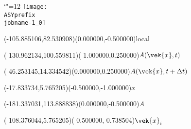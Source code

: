 \setlength{\unitlength}{1pt}%
\makeatletter%
\let\ASYencoding\f@encoding%
\let\ASYfamily\f@family%
\let\ASYseries\f@series%
\let\ASYshape\f@shape%
\makeatother%
{\catcode`"=12%
\texttt{[image: \\ASYprefix\\jobname-1\_0]}%
}%
%
%
\fontsize{8.000000}{9.600000}\selectfont%
\usefont{\ASYencoding}{\ASYfamily}{\ASYseries}{\ASYshape}%
\ASYalign(-105.885106,82.530908)(0.000000,-0.500000){local}%
%
%
\fontsize{8.000000}{9.600000}\selectfont%
\ASYalign(-130.962134,100.559811)(-1.000000,0.250000){$A(\vek{x},t)$}%
%
%
\fontsize{8.000000}{9.600000}\selectfont%
\ASYalign(-46.253145,14.334542)(0.000000,0.250000){$A(\vek{x},t+\Delta t)$}%
%
%
\fontsize{8.000000}{9.600000}\selectfont%
\ASYalign(-17.833734,5.765205)(-0.500000,-1.000000){$x$}%
%
%
\fontsize{8.000000}{9.600000}\selectfont%
\ASYalign(-181.337031,113.888838)(0.000000,-0.500000){$A$}%
%
%
\fontsize{8.000000}{9.600000}\selectfont%
\ASYalign(-108.376044,5.765205)(-0.500000,-0.738504){$\vek{x}_i$}%
